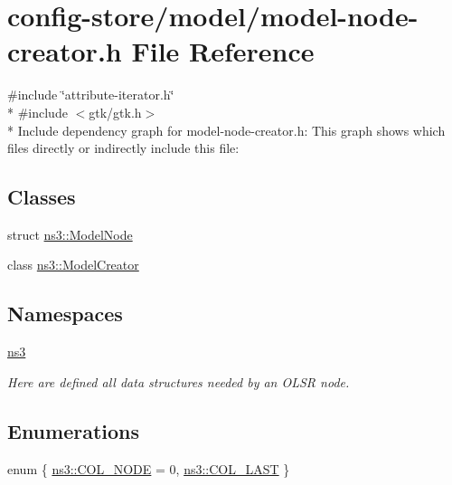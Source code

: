 \hypertarget{model-node-creator_8h}{}\section{config-\/store/model/model-\/node-\/creator.h File Reference}
\label{model-node-creator_8h}
{\ttfamily \#include \char`\"{}attribute-\/iterator.\+h\char`\"{}}\\*
{\ttfamily \#include $<$gtk/gtk.\+h$>$}\\*
Include dependency graph for model-\/node-\/creator.h\+:
This graph shows which files directly or indirectly include this file\+:
\subsection*{Classes}
\begin{DoxyCompactItemize}
\item 
struct \hyperlink{structns3_1_1ModelNode}{ns3\+::\+Model\+Node}
\item 
class \hyperlink{classns3_1_1ModelCreator}{ns3\+::\+Model\+Creator}
\end{DoxyCompactItemize}
\subsection*{Namespaces}
\begin{DoxyCompactItemize}
\item 
 \hyperlink{namespacens3}{ns3}
\begin{DoxyCompactList}\small\item\em Here are defined all data structures needed by an O\+L\+SR node. \end{DoxyCompactList}\end{DoxyCompactItemize}
\subsection*{Enumerations}
\begin{DoxyCompactItemize}
\item 
enum \{ \hyperlink{namespacens3_a6e83be9a9c7a487ef6583e1c7b5db333aa46c0042b4c683cb857d46a67f1ced28}{ns3\+::\+C\+O\+L\+\_\+\+N\+O\+DE} = 0, 
\hyperlink{namespacens3_a6e83be9a9c7a487ef6583e1c7b5db333a7d7fad15f1c717d9de73f71dca0f4966}{ns3\+::\+C\+O\+L\+\_\+\+L\+A\+ST}
 \}
\end{DoxyCompactItemize}
